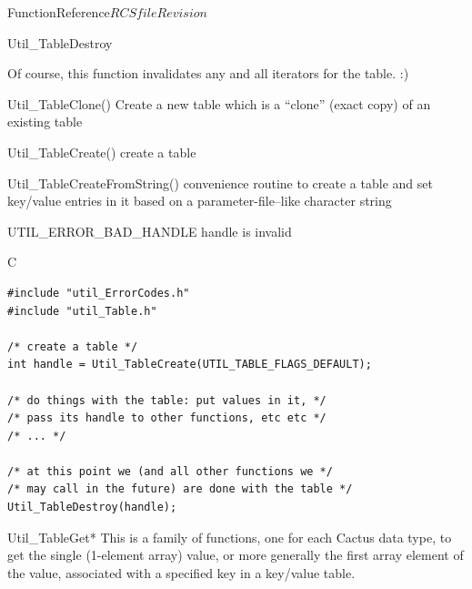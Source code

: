 \begin{cactuspart}{FunctionReference}{$RCSfile$}{$Revision$}
\begin{FunctionDescription}{Util\_TableDestroy}
\begin{Discussion}
Of course, this function invalidates any and all iterators for the table. :)
\end{Discussion}

\begin{SeeAlsoSection}
\begin{SeeAlso}{Util\_TableClone()}
Create a new table which is a ``clone'' (exact copy) of an existing
table
\end{SeeAlso}
\begin{SeeAlso}{Util\_TableCreate()}
create a table
\end{SeeAlso}
\begin{SeeAlso}{Util\_TableCreateFromString()}
convenience routine to create a table and set key/value entries
in it based on a parameter-file--like character string
\end{SeeAlso}
\end{SeeAlsoSection}

\begin{ErrorSection}
\begin{Error}{UTIL\_ERROR\_BAD\_HANDLE}
handle is invalid
\end{Error}
\end{ErrorSection}

\begin{ExampleSection}
\begin{Example}{C}
\begin{verbatim}
#include "util_ErrorCodes.h"
#include "util_Table.h"

/* create a table */
int handle = Util_TableCreate(UTIL_TABLE_FLAGS_DEFAULT);

/* do things with the table: put values in it, */
/* pass its handle to other functions, etc etc */
/* ... */

/* at this point we (and all other functions we */
/* may call in the future) are done with the table */
Util_TableDestroy(handle);
\end{verbatim}
\end{Example}
\end{ExampleSection}
\end{FunctionDescription}


\begin{FunctionDescription}{Util\_TableGet*}
\label{Util-TableGet*}
This is a family of functions, one for each Cactus data type,
to get the single (1-element array) value, or more generally the
first array element of the value, associated with a specified key
in a key/value table.


\end{FunctionDescription}
\end{cactuspart}
